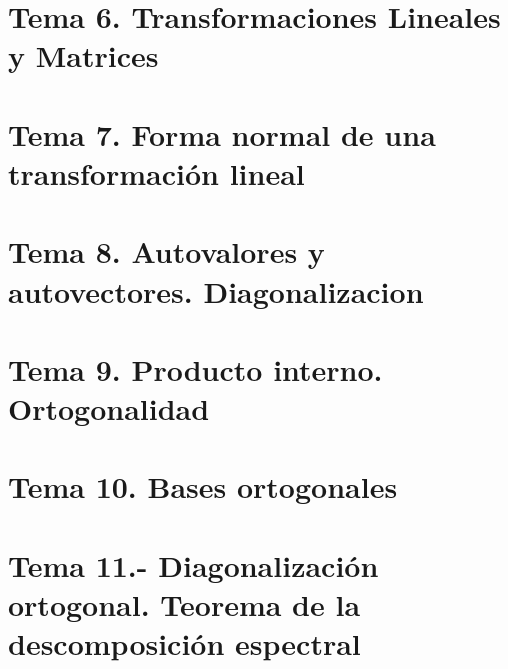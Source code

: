 \documentclass[12pt]{report} %
\begin{document}
\part{Tema 6. Transformaciones Lineales y Matrices}




\part{Tema 7. Forma normal de una transformación lineal}




\part{Tema 8. Autovalores  y autovectores. Diagonalizacion}






\part{Tema 9. Producto interno. Ortogonalidad}





\part{Tema 10. Bases ortogonales}




\part{Tema 11.- Diagonalización ortogonal. Teorema de la descomposición espectral}




\end{document}
